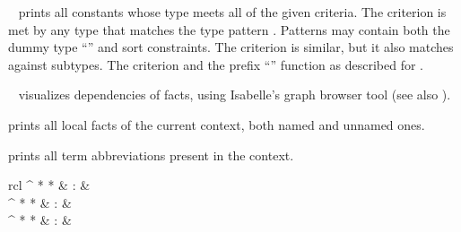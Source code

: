 \begin{isabellebody}
\begin{isamarkuptext}
\begin{description}
  \item \hyperlink{command.find-consts}{\mbox{}}~ prints all constants
  whose type meets all of the given criteria. The criterion  is met by any type that matches the type pattern
  .  Patterns may contain both the dummy type ``\isa{{\isacharunderscore}}''
  and sort constraints. The criterion  is similar, but it
  also matches against subtypes. The criterion  and
  the prefix ``\isa{{\isachardoublequote}{\isacharminus}{\isachardoublequote}}'' function as described for \hyperlink{command.find-theorems}{\mbox{}}.

  \item \hyperlink{command.thm-deps}{\mbox{}}~
  visualizes dependencies of facts, using Isabelle's graph browser
  tool (see also \cite{isabelle-sys}).
  
  \item \hyperlink{command.print-facts}{\mbox{}} prints all local facts of the
  current context, both named and unnamed ones.
  
  \item \hyperlink{command.print-binds}{\mbox{}} prints all term abbreviations
  present in the context.

  \end{description}%
\end{isamarkuptext}%
\isamarkuptrue%
%
\isamarkuptrue%
%
\begin{isamarkuptext}%
\begin{matharray}{rcl}
    \hypertarget{command.undo}{\hyperlink{command.undo}{\mbox{}}}^{{ * }{ * }} & : &  \\
    \hypertarget{command.linear-undo}{\hyperlink{command.linear-undo}{\mbox{}}}^{{ * }{ * }} & : &  \\
    \hypertarget{command.kill}{\hyperlink{command.kill}{\mbox{}}}^{{ * }{ * }} & : &  \\
  \end{matharray}


\end{isamarkuptext}
\end{isabellebody}
